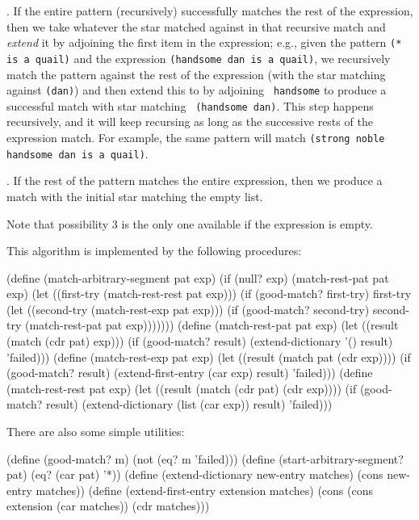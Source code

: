 . If the entire pattern (recursively) successfully matches the rest of
the expression, then we take whatever the star matched against in that
recursive match and {\em extend} it by adjoining the first item in the
expression; e.g., given the pattern {\tt (* is a quail)} and the
expression {\tt (handsome dan is a quail)}, we recursively match the
pattern against the rest of the expression (with the star matching
against {\tt (dan)}) and then extend this to by adjoining {\tt
handsome} to produce a successful match with star matching {\tt
(handsome dan)}.  This step happens recursively, and it will keep
recursing as long as the successive rests of the expression match.
For example, the same pattern will match {\tt (strong noble handsome
dan is a quail)}.

. If the rest of the pattern matches the entire expression, then we
produce a match with the initial star matching the empty list.

Note that possibility 3 is the only one available if the expression is
empty.

This algorithm is implemented by the following procedures:

\beginlisp
(define (match-arbitrary-segment pat exp)
  (if (null? exp)
      (match-rest-pat pat exp)
      (let ((first-try (match-rest-rest pat exp)))
        (if (good-match? first-try)
            first-try
            (let ((second-try (match-rest-exp pat exp)))
              (if (good-match? second-try)
                  second-try
                  (match-rest-pat pat exp)))))))
\null
(define (match-rest-pat pat exp)
  (let ((result (match (cdr pat) exp)))
    (if (good-match? result)
        (extend-dictionary '() result)
        'failed)))
\null
(define (match-rest-exp pat exp)
  (let ((result (match pat (cdr exp))))
    (if (good-match? result)
        (extend-first-entry (car exp) result)
        'failed)))
\null
(define (match-rest-rest pat exp)
  (let ((result (match (cdr pat) (cdr exp))))
    (if (good-match? result)
        (extend-dictionary (list (car exp)) result)
        'failed)))
\endlisp

There are also some simple utilities:

\beginlisp
(define (good-match? m)
  (not (eq? m 'failed)))
\null
(define (start-arbitrary-segment? pat)
  (eq? (car pat) '*))
\null
(define (extend-dictionary new-entry matches)
  (cons  new-entry  matches))
\null
(define (extend-first-entry extension matches)
  (cons (cons extension (car matches)) (cdr matches)))
\endlisp


